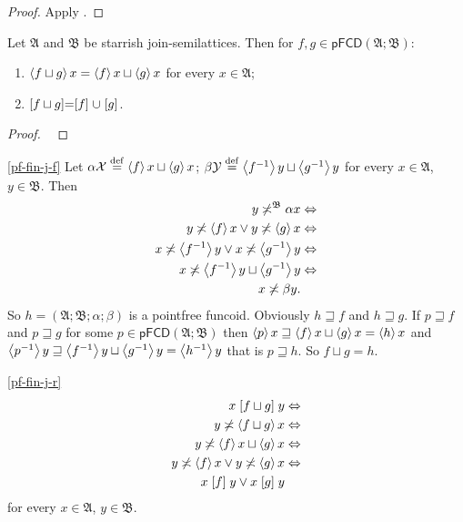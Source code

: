 \begin{proof}
Apply \cite{pm:complete-lattice-criteria}.\end{proof}
\begin{thm}
\label{pf-fin-join}Let $\mathfrak{A}$ and $\mathfrak{B}$ be starrish
join-semilattices. Then for $f,g\in\mathsf{pFCD}(\mathfrak{A};\mathfrak{B})$:
\begin{enumerate}
\item \label{pf-fin-j-f}$\left\langle f\sqcup g\right\rangle x=\left\langle f\right\rangle x\sqcup\left\langle g\right\rangle x$
for every $x\in\mathfrak{A}$;
\item \label{pf-fin-j-r}$\mathrel{\left[f\sqcup g\right]}=\mathrel{\left[f\right]}\cup\mathrel{\left[g\right]}$.
\end{enumerate}
\end{thm}
\begin{proof}
~\end{proof}
\begin{widedisorder}
\item [{\ref{pf-fin-j-f}}] Let $\alpha\mathcal{X}\overset{\mathrm{def}}{=}\left\langle f\right\rangle x\sqcup\left\langle g\right\rangle x$;
$\beta\mathcal{Y}\overset{\mathrm{def}}{=}\left\langle f^{-1}\right\rangle y\sqcup\left\langle g^{-1}\right\rangle y$ for
every $x\in\mathfrak{A}$, $y\in\mathfrak{B}$. Then
\begin{align*}
y\not\asymp^{\mathfrak{B}}\alpha x & \Leftrightarrow\\
y\not\asymp\left\langle f\right\rangle x\lor y\not\asymp\left\langle g\right\rangle x & \Leftrightarrow\\
x\not\asymp\left\langle f^{-1}\right\rangle y\lor x\not\asymp\left\langle g^{-1}\right\rangle y & \Leftrightarrow\\
x\not\asymp\left\langle f^{-1}\right\rangle y\sqcup\left\langle g^{-1}\right\rangle y & \Leftrightarrow\\
x\not\asymp\beta y.
\end{align*}
So $h=(\mathfrak{A};\mathfrak{B};\alpha;\beta)$ is a pointfree funcoid.
Obviously $h\sqsupseteq f$ and $h\sqsupseteq g$. If $p\sqsupseteq f$
and $p\sqsupseteq g$ for some $p\in\mathsf{pFCD}(\mathfrak{A};\mathfrak{B})$
then $\left\langle p\right\rangle x\sqsupseteq\left\langle f\right\rangle x\sqcup\left\langle g\right\rangle x=\left\langle h\right\rangle x$
and $\left\langle p^{-1}\right\rangle y\sqsupseteq\left\langle f^{-1}\right\rangle y\sqcup\left\langle g^{-1}\right\rangle y=\left\langle h^{-1}\right\rangle y$
that is $p\sqsupseteq h$. So $f\sqcup g=h$.
\item [{\ref{pf-fin-j-r}}] ~
\begin{align*}
x\mathrel{\left[f\sqcup g\right]}y & \Leftrightarrow\\
y\not\asymp\left\langle f\sqcup g\right\rangle x & \Leftrightarrow\\
y\not\asymp\left\langle f\right\rangle x\sqcup\left\langle g\right\rangle x & \Leftrightarrow\\
y\not\asymp\left\langle f\right\rangle x\lor y\not\asymp\left\langle g\right\rangle x & \Leftrightarrow\\
x\mathrel{\left[f\right]}y\lor x\mathrel{\left[g\right]}y
\end{align*}
for every $x\in\mathfrak{A}$, $y\in\mathfrak{B}$.\end{widedisorder}

